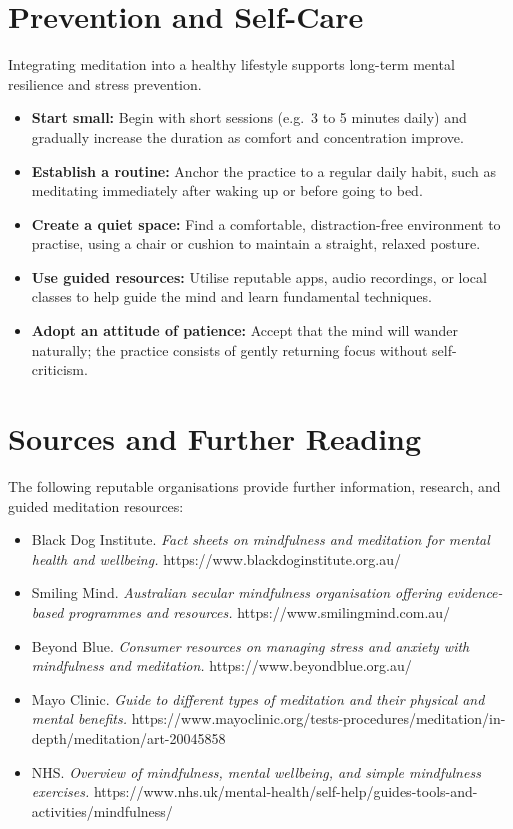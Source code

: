 \section*{Prevention and Self-Care}
Integrating meditation into a healthy lifestyle supports long-term mental resilience and stress prevention.
\begin{itemize}
    \item \textbf{Start small:} Begin with short sessions (e.g.\ 3 to 5 minutes daily) and gradually increase the duration as comfort and concentration improve.
    \item \textbf{Establish a routine:} Anchor the practice to a regular daily habit, such as meditating immediately after waking up or before going to bed.
    \item \textbf{Create a quiet space:} Find a comfortable, distraction-free environment to practise, using a chair or cushion to maintain a straight, relaxed posture.
    \item \textbf{Use guided resources:} Utilise reputable apps, audio recordings, or local classes to help guide the mind and learn fundamental techniques.
    \item \textbf{Adopt an attitude of patience:} Accept that the mind will wander naturally; the practice consists of gently returning focus without self-criticism.
\end{itemize}

\section*{Sources and Further Reading}
The following reputable organisations provide further information, research, and guided meditation resources:
\begin{itemize}
    \item Black Dog Institute. \textit{Fact sheets on mindfulness and meditation for mental health and wellbeing.} https://www.blackdoginstitute.org.au/
    \item Smiling Mind. \textit{Australian secular mindfulness organisation offering evidence-based programmes and resources.} https://www.smilingmind.com.au/
    \item Beyond Blue. \textit{Consumer resources on managing stress and anxiety with mindfulness and meditation.} https://www.beyondblue.org.au/
    \item Mayo Clinic. \textit{Guide to different types of meditation and their physical and mental benefits.} https://www.mayoclinic.org/tests-procedures/meditation/in-depth/meditation/art-20045858
    \item NHS. \textit{Overview of mindfulness, mental wellbeing, and simple mindfulness exercises.} https://www.nhs.uk/mental-health/self-help/guides-tools-and-activities/mindfulness/
\end{itemize}
